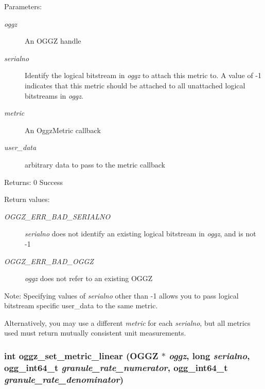 \begin{Desc}
\item[Parameters:]
\begin{description}
\item[{\em oggz}]An OGGZ handle \item[{\em serialno}]Identify the logical bitstream in {\em oggz\/} to attach this metric to. A value of -1 indicates that this metric should be attached to all unattached logical bitstreams in {\em oggz\/}. \item[{\em metric}]An Oggz\-Metric callback \item[{\em user\_\-data}]arbitrary data to pass to the metric callback\end{description}
\end{Desc}
\begin{Desc}
\item[Returns:]0 Success \end{Desc}
\begin{Desc}
\item[Return values:]
\begin{description}
\item[{\em OGGZ\_\-ERR\_\-BAD\_\-SERIALNO}]{\em serialno\/} does not identify an existing logical bitstream in {\em oggz\/}, and is not -1 \item[{\em OGGZ\_\-ERR\_\-BAD\_\-OGGZ}]{\em oggz\/} does not refer to an existing OGGZ\end{description}
\end{Desc}
\begin{Desc}
\item[Note:]Specifying values of {\em serialno\/} other than -1 allows you to pass logical bitstream specific user\_\-data to the same metric. 

Alternatively, you may use a different {\em metric\/} for each {\em serialno\/}, but all metrics used must return mutually consistent unit measurements. \end{Desc}
\subsubsection{\setlength{\rightskip}{0pt plus 5cm}int oggz\_\-set\_\-metric\_\-linear ({\bf OGGZ} $\ast$ {\em oggz}, long {\em serialno}, ogg\_\-int64\_\-t {\em granule\_\-rate\_\-numerator}, ogg\_\-int64\_\-t {\em granule\_\-rate\_\-denominator})}\label{group__seek__api_a1}


